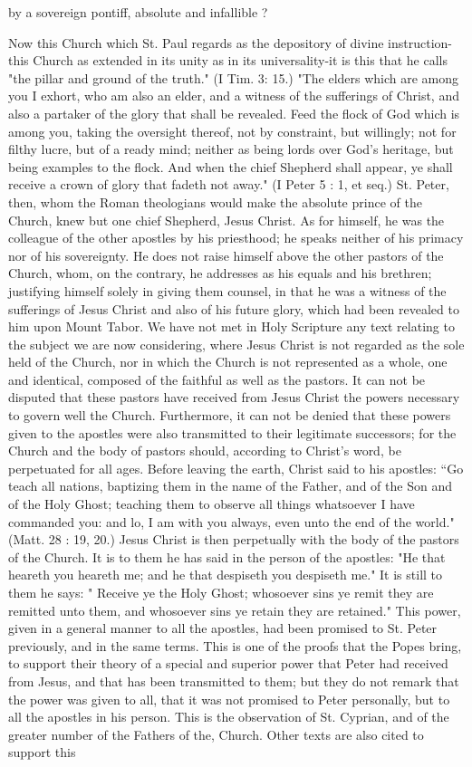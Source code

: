 by a sovereign pontiff, absolute and infallible ?

Now this Church which St. Paul regards as the depository of divine instruction-this Church as extended in its unity as in its universality-it is this that he calls "the pillar and ground of the truth." (I Tim. 3: 15.) "The elders which are among you I exhort, who am also an elder, and a witness of the sufferings of Christ, and also a partaker of the glory that shall be revealed. Feed the flock of God which is among you, taking the oversight thereof, not by constraint, but willingly; not for filthy lucre, but of a ready mind; neither as being lords over God's heritage, but being examples to the flock. And when the chief Shepherd shall appear, ye shall receive a crown of glory that fadeth not away." (I Peter 5 : 1, et seq.) St. Peter, then, whom the Roman theologians would make the absolute prince of the Church, knew but one chief Shepherd, Jesus Christ. As for himself, he was the colleague of the other apostles by his priesthood; he speaks neither of his primacy nor of his sovereignty. He does not raise himself above the other pastors of the Church, whom, on the contrary, he addresses as his equals and his brethren; justifying himself solely in giving them counsel, in that he was a witness of the sufferings of Jesus Christ and also of his future glory, which had been revealed to him upon Mount Tabor. We have not met in Holy Scripture any text relating to the subject we are now considering, where Jesus Christ is not regarded as the sole held of the Church, nor in which the Church is not represented as a whole, one and identical, composed of the faithful as well as the pastors. It can not be disputed that these pastors have received from Jesus Christ the powers necessary to govern well the Church. Furthermore, it can not be denied that these powers given to the apostles were also transmitted to their legitimate successors; for the Church and the body of pastors should, according to Christ's word, be perpetuated for all ages. Before leaving the earth, Christ said to his apostles: “Go teach all nations, baptizing them in the name of the Father, and of the Son and of the Holy Ghost; teaching them to observe all things whatsoever I have commanded you: and lo, I am with you always, even unto the end of the world." (Matt. 28 : 19, 20.) Jesus Christ is then perpetually with the body of the pastors of the Church. It is to them he has said in the person of the apostles: "He that heareth you heareth me; and he that despiseth you despiseth me." It is still to them he says: " Receive ye the Holy Ghost; whosoever sins ye remit they are remitted unto them, and whosoever sins ye retain they are retained." This power, given in a general manner to all the apostles, had been promised to St. Peter previously, and in the same terms. This is one of the proofs that the Popes bring, to support their theory of a special and superior power that Peter had received from Jesus, and that has been transmitted to them; but they do not remark that the power was given to all, that it was not promised to Peter personally, but to all the apostles in his person. This is the observation of St. Cyprian, and of the greater number of the Fathers of the, Church. Other texts are also cited to support this 